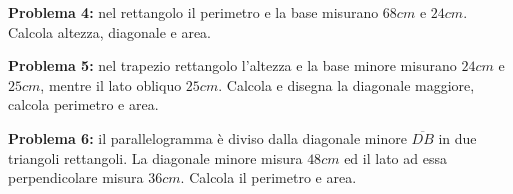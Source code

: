 \documentclass[14pt]{extarticle}
\begin{document}
\clearpage
\textbf{Problema 4:} nel rettangolo il perimetro e la base misurano \(68cm\) e \(24cm\). Calcola altezza, diagonale e area.\\

\vspace{0.5cm}
\hspace{0.5cm}

\vspace{1cm}
\textbf{Problema 5:} nel trapezio rettangolo l'altezza e la base minore misurano \(24cm\) e \(25cm\), mentre il lato obliquo \(25cm\). Calcola e disegna la diagonale maggiore, calcola perimetro e area.\\

\vspace{0.5cm}

\vspace{1cm}
\textbf{Problema 6:} il parallelogramma è diviso dalla diagonale minore \(\overline{DB}\) in due triangoli rettangoli. La diagonale minore misura \(48cm\) ed il lato ad essa perpendicolare misura \(36cm\). Calcola il perimetro e area.

\vspace{0.5cm}
\clearpage
\end{document}
